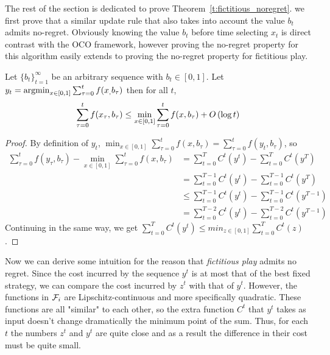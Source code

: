 
The rest of the section is dedicated to prove Theorem~\ref{t:fictitious_noregret}. we first prove that a similar update rule that also takes into
account the value $b_t$ admits no-regret. Obviously knowing the value $b_t$ before time selecting $x_t$ is direct contrast
with the OCO framework, however proving the no-regret property for this algorithm easily extends to proving the no-regret property 
for fictitious play. 

\begin{lemma}
Let $\{b_t\}_{t=1}^\infty$ be an arbitrary sequence with $b_t \in [0,1]$. Let $y_t = \operatorname*{argmin}_{x \in [0,1]}\sum_{\tau=0}^tf(x_,b_\tau)$
then for all $t$, 
\[\sum_{\tau=0}^{t}f(x_\tau,b_\tau) \leq \min_{x \in [0,1]}\sum_{\tau=0}^tf(x,b_\tau) + O\left(\log t\right)\]
\end{lemma}

\begin{proof}By definition of $y_t$,
  $\min_{ x \in [0,1]} \sum_{\tau=0}^t f(x,b_\tau) = \sum_{\tau=0}^t f(y_t,b_\tau)$, so
  \begin{align*}
    \sum_{\tau=0}^t f(y_\tau,b_\tau) - \min_{ x \in [0,1]} \sum_{\tau=0}^t f(x,b_\tau) &=
    \sum_{t=0}^T C^t(y^t) - \sum_{t=0}^T C^t(y^T)\\
    &= \sum_{t=0}^{T-1} C^t(y^t) - \sum_{t=0}^{T-1} C^t(y^T)\\
    &\leq \sum_{t=0}^{T-1} C^t(y^t) - \sum_{t=0}^{T-1} C^t(y^{T-1})\\
    &= \sum_{t=0}^{T-2} C^t(y^t) - \sum_{t=0}^{T-2} C^t(y^{T-1})
  \end{align*}
  Continuing in the same way, we get
  $\sum_{t=0}^T C^t(y^t) \leq min_{ z \in [0,1]} \sum_{t=0}^T C^t(z)$.
\end{proof}

Now we can derive some intuition for the reason that \emph{fictitious play}
admits no regret. Since the cost incurred by the sequence $y^t$ is at most that
of the best fixed strategy, we can compare the cost incurred by $z^t$ with
that of $y^t$.  However, the functions in $\mathcal{F}_i$ are Lipschitz-continuous and more
specifically quadratic.
These functions are all "similar" to each other, so the extra function $C^t$ that $y^t$ takes
as input doesn't change dramatically the minimum point of the sum.
Thus, for each $t$ the numbers $z^t$ and $y^t$ are quite
close and as a result the difference in their cost must be quite small.

